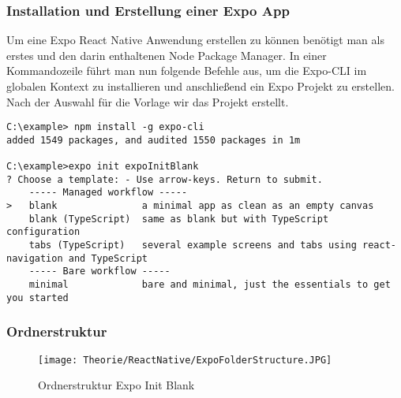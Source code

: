 \subsubsection{Installation und Erstellung einer Expo App}
Um eine Expo React Native Anwendung erstellen zu können benötigt man als erstes  und
den darin enthaltenen Node Package Manager. In einer Kommandozeile führt man nun folgende Befehle
aus, um die Expo-CLI im globalen Kontext zu installieren und anschließend ein Expo Projekt zu
erstellen. Nach der Auswahl für die Vorlage wir das Projekt erstellt.

\begin{lstlisting}
C:\example> npm install -g expo-cli
added 1549 packages, and audited 1550 packages in 1m

C:\example>expo init expoInitBlank
? Choose a template: - Use arrow-keys. Return to submit.
    ----- Managed workflow -----
>   blank               a minimal app as clean as an empty canvas
    blank (TypeScript)  same as blank but with TypeScript configuration
    tabs (TypeScript)   several example screens and tabs using react-navigation and TypeScript
    ----- Bare workflow -----
    minimal             bare and minimal, just the essentials to get you started
\end{lstlisting}

\subsubsection{Ordnerstruktur}
\begin{figure}[H]
  \begin{center}
    \texttt{[image: Theorie/ReactNative/ExpoFolderStructure.JPG]}
    \caption{Ordnerstruktur Expo Init Blank}
  \end{center}
\end{figure}


